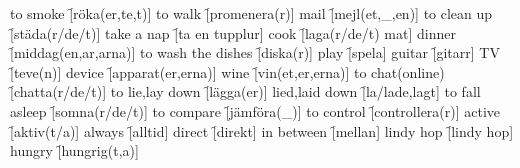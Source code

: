 \begin{questions}
\begin{multicols}{2}
        \question to smoke \f[röka(er,te,t)]
        \question to walk \f[promenera(r)]
        \question mail \f[mejl(et,\_,en)]
        \question to clean up \f[städa(r/de/t)]
        \question take a nap \f[ta en tupplur]
        \question cook \f[laga(r/de/t) mat]
        \question dinner \f[middag(en,ar,arna)]
        \question to wash the dishes \f[diska(r)]
        \question play \f[spela]
        \question guitar \f[gitarr]
        \question TV \f[teve(n)]
        \question device \f[apparat(er,erna)]
        \question wine \f[vin(et,er,erna)]
        \question to chat(online) \f[chatta(r/de/t)]
        \question to lie,lay down \f[lägga(er)]
        \question lied,laid down \f[la/lade,lagt]
        \question to fall asleep \f[somna(r/de/t)]
        \question to compare \f[jämföra(\_)]
        \question to control \f[controllera(r)]
        \question active \f[aktiv(t/a)]
        \question always \f[alltid]
        \question direct \f[direkt]
        \question in between \f[mellan]
        \question lindy hop \f[lindy hop]
        \question hungry \f[hungrig(t,a)]
    \end{multicols}
\end{questions}
